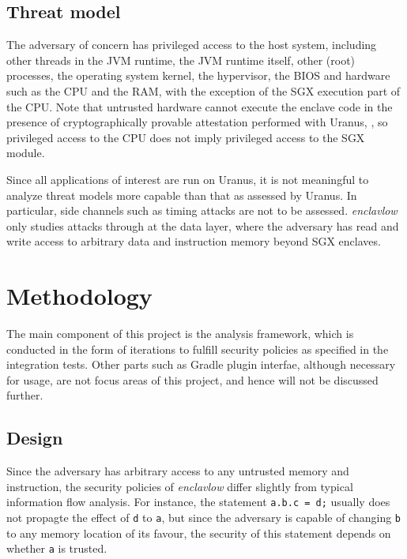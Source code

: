 \documentclass[a4paper, 12pt]{article}
\def\pname{\emph{enclavlow}}
\def\code#1{\colorbox{code}{\texttt{\footnotesize #1}}}
\begin{document}
\subsection{Threat model}
The adversary of concern has privileged access to the host system,
including other threads in the JVM runtime, the JVM runtime itself,
other (root) processes, the operating system kernel,
the hypervisor, the BIOS and hardware such as the CPU and the RAM,
with the exception of the SGX execution part of the CPU.
Note that untrusted hardware cannot execute the enclave code
in the presence of cryptographically provable attestation performed with Uranus,
\cite{uranus},
so privileged access to the CPU does not imply privileged access to the SGX module.

Since all applications of interest are run on Uranus,
it is not meaningful to analyze threat models more capable than that as assessed by Uranus.
In particular, side channels such as timing attacks are not to be assessed.
\pname{} only studies attacks through at the data layer,
where the adversary has read and write access
to arbitrary data and instruction memory beyond SGX enclaves.


\section{Methodology}
The main component of this project is the analysis framework,
which is conducted in the form of iterations
to fulfill security policies as specified in the integration tests.
Other parts such as Gradle plugin interfae,
although necessary for usage,
are not focus areas of this project, and hence will not be discussed further.

\subsection{Design}
Since the adversary has arbitrary access to any untrusted memory and instruction,
the security policies of \pname{} differ slightly from typical information flow analysis.
For instance, the statement \code{a.b.c = d;} usually
does not propagte the effect of \code{d} to \code{a},
but since the adversary is capable of changing \code{b} to any memory location of its favour,
the security of this statement depends on whether \code{a} is trusted.
\end{document}
